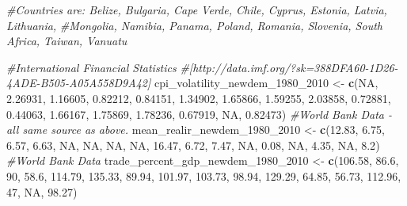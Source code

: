 \documentclass[11pt, oneside]{article}   	%
\newenvironment{Shaded}{\begin{snugshade}}{\end{snugshade}}
\newcommand{\CommentTok}[1]{\textcolor[rgb]{0.56,0.35,0.01}{\textit{#1}}}
\newcommand{\DecValTok}[1]{\textcolor[rgb]{0.00,0.00,0.81}{#1}}
\newcommand{\FloatTok}[1]{\textcolor[rgb]{0.00,0.00,0.81}{#1}}
\newcommand{\KeywordTok}[1]{\textcolor[rgb]{0.13,0.29,0.53}{\textbf{#1}}}
\newcommand{\NormalTok}[1]{#1}
\newcommand{\OtherTok}[1]{\textcolor[rgb]{0.56,0.35,0.01}{#1}}
\newcommand{\StringTok}[1]{\textcolor[rgb]{0.31,0.60,0.02}{#1}}
\begin{document}
\begin{Shaded}
\begin{Highlighting}[]
\CommentTok{#Countries are: Belize, Bulgaria, Cape Verde, Chile, Cyprus, Estonia, Latvia, Lithuania,}
\CommentTok{#Mongolia, Namibia, Panama, Poland, Romania, Slovenia, South Africa, Taiwan, Vanuatu}

\CommentTok{#International Financial Statistics}
\CommentTok{#[http://data.imf.org/?sk=388DFA60-1D26-4ADE-B505-A05A558D9A42]}
\NormalTok{cpi_volatility_newdem_}\DecValTok{1980}\NormalTok{_}\DecValTok{2010}\NormalTok{ <-}\StringTok{ }\KeywordTok{c}\NormalTok{(}\OtherTok{NA}\NormalTok{, }\FloatTok{2.26931}\NormalTok{, }\FloatTok{1.16605}\NormalTok{, }\FloatTok{0.82212}\NormalTok{, }\FloatTok{0.84151}\NormalTok{, }\FloatTok{1.34902}\NormalTok{,}
                                     \FloatTok{1.65866}\NormalTok{, }\FloatTok{1.59255}\NormalTok{, }\FloatTok{2.03858}\NormalTok{, }\FloatTok{0.72881}\NormalTok{, }\FloatTok{0.44063}\NormalTok{, }\FloatTok{1.66167}\NormalTok{,}
                                     \FloatTok{1.75869}\NormalTok{, }\FloatTok{1.78236}\NormalTok{, }\FloatTok{0.67919}\NormalTok{, }\OtherTok{NA}\NormalTok{, }\FloatTok{0.82473}\NormalTok{)}
\CommentTok{#World Bank Data - all same source as above.}
\NormalTok{mean_realir_newdem_}\DecValTok{1980}\NormalTok{_}\DecValTok{2010}\NormalTok{ <-}\StringTok{ }\KeywordTok{c}\NormalTok{(}\FloatTok{12.83}\NormalTok{, }\FloatTok{6.75}\NormalTok{, }\FloatTok{6.57}\NormalTok{, }\FloatTok{6.63}\NormalTok{, }\OtherTok{NA}\NormalTok{, }\OtherTok{NA}\NormalTok{, }\OtherTok{NA}\NormalTok{, }\OtherTok{NA}\NormalTok{, }\FloatTok{16.47}\NormalTok{, }\FloatTok{6.72}\NormalTok{,}
                                  \FloatTok{7.47}\NormalTok{, }\OtherTok{NA}\NormalTok{, }\FloatTok{0.08}\NormalTok{, }\OtherTok{NA}\NormalTok{, }\FloatTok{4.35}\NormalTok{, }\OtherTok{NA}\NormalTok{, }\FloatTok{8.2}\NormalTok{)}
\CommentTok{#World Bank Data}
\NormalTok{trade_percent_gdp_newdem_}\DecValTok{1980}\NormalTok{_}\DecValTok{2010}\NormalTok{ <-}\StringTok{ }\KeywordTok{c}\NormalTok{(}\FloatTok{106.58}\NormalTok{, }\FloatTok{86.6}\NormalTok{, }\DecValTok{90}\NormalTok{, }\FloatTok{58.6}\NormalTok{, }\FloatTok{114.79}\NormalTok{, }\FloatTok{135.33}\NormalTok{, }\FloatTok{89.94}\NormalTok{, }
                                        \FloatTok{101.97}\NormalTok{, }\FloatTok{103.73}\NormalTok{, }\FloatTok{98.94}\NormalTok{, }\FloatTok{129.29}\NormalTok{, }\FloatTok{64.85}\NormalTok{, }\FloatTok{56.73}\NormalTok{,}
                                        \FloatTok{112.96}\NormalTok{, }\DecValTok{47}\NormalTok{, }\OtherTok{NA}\NormalTok{, }\FloatTok{98.27}\NormalTok{)}

\end{Highlighting}
\end{Shaded}
\end{document}

